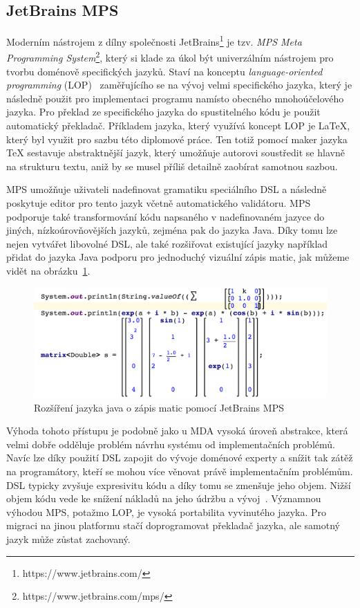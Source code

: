 \subsection{JetBrains MPS}

Moderním nástrojem z dílny společnosti JetBrains\footnote{https://www.jetbrains.com/}
je tzv. \textit{MPS \textendash\xspace Meta Programming System}\footnote{https://www.jetbrains.com/mps/}, který si klade za úkol být univerzálním
nástrojem pro tvorbu doménově specifických jazyků. Staví na konceptu \textit{language-oriented
programming} (\gls{LOP})~\cite{ward1994language} zaměřujícího se na vývoj velmi specifického jazyka,
který je následně použit pro implementaci programu namísto obecného mnohoúčelového jazyka. Pro překlad
ze specifického jazyka do spustitelného kódu je použit automatický překladač. Příkladem jazyka, který využívá koncept \gls{LOP}
je \LaTeX\xspace, který byl využit pro sazbu této diplomové práce. Ten totiž pomocí maker jazyka \TeX\xspace
sestavuje abstraktnější jazyk, který umožňuje autorovi soustředit se hlavně na strukturu textu, aniž by
se musel příliš detailně zaobírat samotnou sazbou.

MPS umožňuje uživateli nadefinovat gramatiku speciálního \gls{DSL} a následně poskytuje
editor pro tento jazyk včetně automatického validátoru. MPS podporuje také transformování kódu napsaného
v nadefinovaném jazyce do jiných, nízkoúrovňovějších jazyků, zejména pak do jazyka Java.
Díky tomu lze nejen vytvářet libovolné \gls{DSL}, ale také rozšiřovat existující
jazyky \textendash\xspace například přidat do jazyka Java podporu pro jednoduchý vizuální
zápis matic, jak můžeme vidět na obrázku~\ref{fig:java-matrix}.

\begin{figure}[t]
    \centering
    \includegraphics[keepaspectratio=true, width=0.7\linewidth]{figures/java-matrix.png}
    \caption{Rozšíření jazyka java o zápis matic pomocí JetBrains MPS}
    \label{fig:java-matrix}
\end{figure}

Výhoda tohoto přístupu je podobně jako u \gls{MDA} vysoká úroveň abstrakce, která
velmi dobře odděluje problém návrhu systému od implementačních problémů.
Navíc lze díky použití \gls{DSL} zapojit do vývoje doménové experty a snížit tak
zátěž na programátory, kteří se mohou více věnovat právě implementačním problémům.
\gls{DSL} typicky zvyšuje expresivitu kódu a díky tomu se zmenšuje jeho objem.
Nižší objem kódu vede ke snížení nákladů na jeho údržbu a vývoj~\cite{littman1987mental}\cite{soloway1986empirical}.
Významnou výhodou MPS, potažmo \gls{LOP}, je vysoká portabilita vyvinutého jazyka.
Pro migraci na jinou platformu stačí doprogramovat překladač jazyka, ale
samotný jazyk může zůstat zachovaný.

